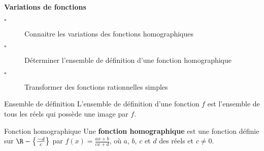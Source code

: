 \begin{titre}

\end{titre}


\begin{CpsCol}
\textbf{Variations de fonctions}
\begin{description}
\item[$\square$] Connaitre les variations des fonctions homographiques
\item[$\square$] Déterminer l'ensemble de définition d'une fonction homographique
\item[$\square$] Transformer des fonctions rationnelles simples
\end{description}
\end{CpsCol}




\begin{DefT}{Ensemble de définition} 
L'ensemble de définition d'une fonction $f$ est l'ensemble de tous les réels qui possède une image par $f$.
\end{DefT}


\begin{DefT}{Fonction homographique} 
Une \textbf{fonction homographique} est une fonction définie sur $\R-\left\lbrace \frac{-d}{c} \right\rbrace$ par $f(x) = \frac{ax+b}{cx+d}$, où $a$, $b$, $c$ et $d$ des réels et $c \neq 0$.
\end{DefT}








